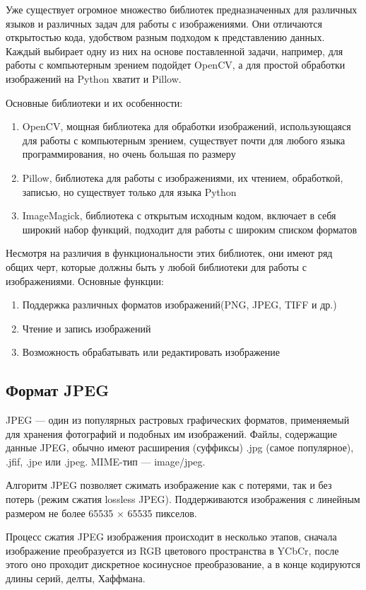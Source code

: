Уже существует огромное множество библиотек предназначенных для различных языков и различных задач для работы с изображениями. Они отличаются открытостью кода, удобством разным подходом к представлению данных. Каждый выбирает одну из них на основе поставленной задачи, например, для работы с компьютерным зрением подойдет OpenCV, а для простой обработки изображений на Python хватит и Pillow.

Основные библиотеки и их особенности:
\begin{enumerate}
\item OpenCV, мощная библиотека для обработки изображений, использующаяся для работы с компьютерным зрением, существует почти для любого языка программирования, но очень большая по размеру
\item Pillow, библиотека для работы с изображениями, их чтением, обработкой, записью, но существует только для языка Python
\item ImageMagick, библиотека с открытым исходным кодом, включает в себя широкий набор функций, подходит для работы с широким списком форматов
\end{enumerate}

Несмотря на различия в функциональности этих библиотек, они имеют ряд общих черт, которые должны быть у любой библиотеки для работы с изображениями.
Основные функции:
\begin{enumerate}
\item Поддержка различных форматов изображений(PNG, JPEG, TIFF и др.)
\item Чтение и запись изображений
\item Возможность обрабатывать или редактировать изображение
\end{enumerate}

\subsection{Формат JPEG}

JPEG — один из популярных растровых графических форматов, применяемый для хранения фотографий и подобных им изображений. Файлы, содержащие данные JPEG, обычно имеют расширения (суффиксы) .jpg (самое популярное), .jfif, .jpe или .jpeg. MIME-тип — image/jpeg.

Алгоритм JPEG позволяет сжимать изображение как с потерями, так и без потерь (режим сжатия lossless JPEG). Поддерживаются изображения с линейным размером не более 65535 × 65535 пикселов.

Процесс сжатия JPEG изображения происходит в несколько этапов, сначала изображение преобразуется из RGB цветового пространства в YCbCr, после этого оно проходит дискретное косинусное преобразование, а в конце кодируются длины серий, делты, Хаффмана.

